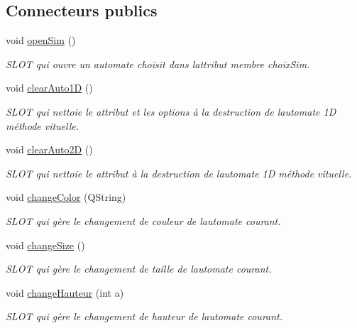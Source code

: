 \subsection*{Connecteurs publics}
\begin{DoxyCompactItemize}
\item 
void \hyperlink{class_main_window_a13e1e518cda3c3ef508f319e5230a425}{open\+Sim} ()
\begin{DoxyCompactList}\small\item\em S\+L\+OT qui ouvre un automate choisit dans l\textquotesingle{}attribut membre choix\+Sim. \end{DoxyCompactList}\item 
void \hyperlink{class_main_window_a97b2dcddfafe0559b8b0e631f2bcf375}{clear\+Auto1D} ()
\begin{DoxyCompactList}\small\item\em S\+L\+OT qui nettoie le attribut et les options à la destruction de l\textquotesingle{}automate 1D méthode vituelle. \end{DoxyCompactList}\item 
void \hyperlink{class_main_window_a37e61e72d181b0a43900167b582caeb4}{clear\+Auto2D} ()
\begin{DoxyCompactList}\small\item\em S\+L\+OT qui nettoie le attribut à la destruction de l\textquotesingle{}automate 1D méthode vituelle. \end{DoxyCompactList}\item 
void \hyperlink{class_main_window_a709661eaabd6f570a8942f66f7c07738}{change\+Color} (Q\+String)
\begin{DoxyCompactList}\small\item\em S\+L\+OT qui gère le changement de couleur de l\textquotesingle{}automate courant. \end{DoxyCompactList}\item 
void \hyperlink{class_main_window_a06ce6c068fd97d586543f7cdd535d23a}{change\+Size} ()
\begin{DoxyCompactList}\small\item\em S\+L\+OT qui gère le changement de taille de l\textquotesingle{}automate courant. \end{DoxyCompactList}\item 
void \hyperlink{class_main_window_ac907dba426762ffbf3a7702af0aba74b}{change\+Hauteur} (int a)
\begin{DoxyCompactList}\small\item\em S\+L\+OT qui gère le changement de hauteur de l\textquotesingle{}automate courant. \end{DoxyCompactList}\item 

\end{DoxyCompactItemize}

